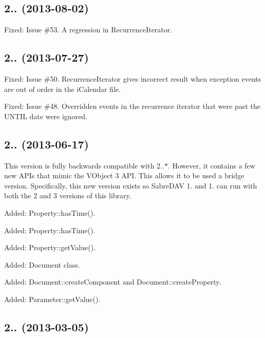 \subsection*{2.. (2013-\/08-\/02) }


\begin{DoxyItemize}
\item Fixed\+: Issue \#53. A regression in Recurrence\+Iterator.
\end{DoxyItemize}

\subsection*{2.. (2013-\/07-\/27) }


\begin{DoxyItemize}
\item Fixed\+: Issue \#50. Recurrence\+Iterator gives incorrect result when exception events are out of order in the i\+Calendar file.
\item Fixed\+: Issue \#48. Overridden events in the recurrence iterator that were past the U\+N\+T\+IL date were ignored.
\end{DoxyItemize}

\subsection*{2.. (2013-\/06-\/17) }


\begin{DoxyItemize}
\item This version is fully backwards compatible with 2..$\ast$. However, it contains a few new A\+PI\textquotesingle{}s that mimic the V\+Object 3 A\+PI. This allows it to be used a \textquotesingle{}bridge\textquotesingle{} version. Specifically, this new version exists so Sabre\+D\+AV 1. and 1. can run with both the 2 and 3 versions of this library.
\item Added\+: Property\+::has\+Time().
\item Added\+: Property\+::has\+Time().
\item Added\+: Property\+::get\+Value().
\item Added\+: Document class.
\item Added\+: Document\+::create\+Component and Document\+::create\+Property.
\item Added\+: Parameter\+::get\+Value().
\end{DoxyItemize}

\subsection*{2.. (2013-\/03-\/05) }


